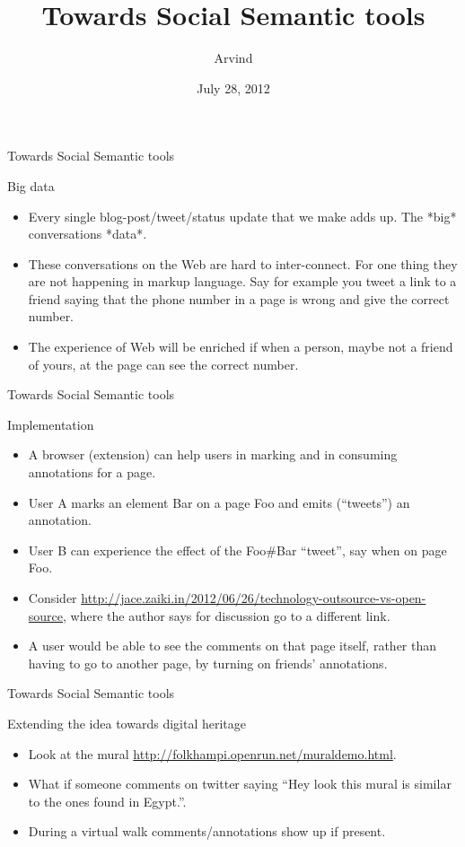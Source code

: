 \documentclass[''urlcolor=red'']{beamer}
\title{Towards Social Semantic tools}
\author{Arvind}
\date{July 28, 2012}
\begin{document}
\begin{frame}
  \titlepage
\end{frame}

\begin{frame}{Towards Social Semantic tools}
  \begin{block}{Big data}
    \begin{itemize}
    \item Every single blog-post/tweet/status update that we make adds up.  The *big* conversations *data*.
    \item These conversations on the Web are hard to inter-connect.  For one thing they are not happening in markup language.  Say for example you tweet a link to a friend saying that the phone number in a page is wrong and give the correct number.
    \item The experience of Web will be enriched if when a person, maybe not a friend of yours, at the page can see the correct number.
    \end{itemize}
  \end{block}
\end{frame}

\begin{frame}{Towards Social Semantic tools}
  \begin{block}{Implementation}
    \begin{itemize}
    \item A browser (extension) can help users in marking and in consuming annotations for a page.
    \item User A marks an element Bar on a page Foo and emits (``tweets'') an annotation.
    \item User B can experience the effect of the Foo\#Bar ``tweet'', say when on page Foo.
    \item Consider \url{http://jace.zaiki.in/2012/06/26/technology-outsource-vs-open-source}, where the author says for discussion go to a different link.
    \item A user would be able to see the comments on that page itself, rather than having to go to another page, by turning on friends' annotations.
    \end{itemize}
  \end{block}
\end{frame}

\begin{frame}{Towards Social Semantic tools}
  \begin{block}{Extending the idea towards digital heritage}
    \begin{itemize}
    \item Look at the mural \url{http://folkhampi.openrun.net/muraldemo.html}.
    \item What if someone comments on twitter saying ``Hey look this mural is similar to the ones found in Egypt.''.
    \item During a virtual walk comments/annotations show up if present.
    \end{itemize}
  \end{block}
\end{frame}
\end{document}

